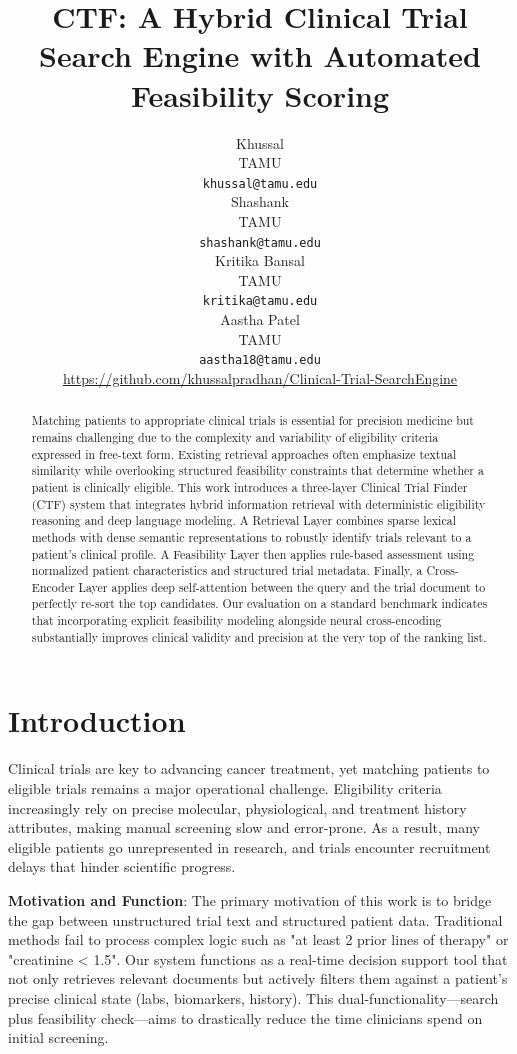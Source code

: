 \documentclass[11pt]{article}
\title{CTF: A Hybrid Clinical Trial Search Engine with Automated Feasibility Scoring}
\author{Khussal \\
  TAMU \\
  \texttt{khussal@tamu.edu} \\\And
  Shashank \\
  TAMU \\
  \texttt{shashank@tamu.edu} \\ \AND
  Kritika Bansal\\
  TAMU \\
  \texttt{kritika@tamu.edu} \\\And
  Aastha Patel\\
  TAMU \\
  \texttt{aastha18@tamu.edu} \\
  \AND
  \normalfont \url{https://github.com/khussalpradhan/Clinical-Trial-SearchEngine}
  }
\begin{document}
\maketitle
\vspace{2cm}
\begin{abstract}
Matching patients to appropriate clinical trials is essential for precision medicine but remains challenging due to the complexity and variability of eligibility criteria expressed in free-text form. Existing retrieval approaches often emphasize textual similarity while overlooking structured feasibility constraints that determine whether a patient is clinically eligible. This work introduces a three-layer Clinical Trial Finder (CTF) system that integrates hybrid information retrieval with deterministic eligibility reasoning and deep language modeling. A Retrieval Layer combines sparse lexical methods with dense semantic representations to robustly identify trials relevant to a patient’s clinical profile. A Feasibility Layer then applies rule-based assessment using normalized patient characteristics and structured trial metadata. Finally, a Cross-Encoder Layer applies deep self-attention between the query and the trial document to perfectly re-sort the top candidates. Our evaluation on a standard benchmark indicates that incorporating explicit feasibility modeling alongside neural cross-encoding substantially improves clinical validity and precision at the very top of the ranking list.
\end{abstract}


\section{Introduction}
Clinical trials are key to advancing cancer treatment, yet matching patients to eligible trials remains a major operational challenge. Eligibility criteria increasingly rely on precise molecular, physiological, and treatment history attributes, making manual screening slow and error-prone. As a result, many eligible patients go unrepresented in research, and trials encounter recruitment delays that hinder scientific progress.

\textbf{Motivation and Function}: The primary motivation of this work is to bridge the gap between unstructured trial text and structured patient data. Traditional methods fail to process complex logic such as "at least 2 prior lines of therapy" or "creatinine < 1.5". Our system functions as a real-time decision support tool that not only retrieves relevant documents but actively filters them against a patient's precise clinical state (labs, biomarkers, history). This dual-functionality—search plus feasibility check—aims to drastically reduce the time clinicians spend on initial screening.
\end{document}
